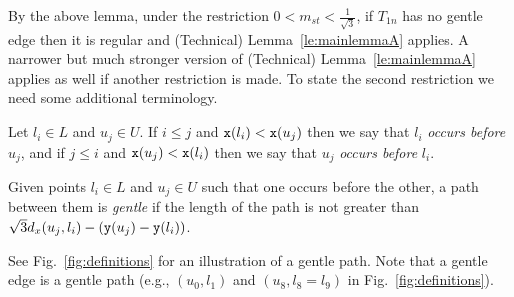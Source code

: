 By the above lemma, under the restriction $0 < m_{st} < \frac{1}{\sqrt{3}}$,
if $T_{1n}$ has no gentle edge then it is regular and (Technical) 
Lemma~\ref{le:mainlemmaA} applies. A narrower but much stronger
version of (Technical) Lemma~\ref{le:mainlemmaA} applies as well if another
restriction is made. To state the second restriction we need
some additional terminology. 

Let $l_i \in L$ and $u_j \in U$. If $i \leq j$ and ${\tt x}(l_i) < {\tt x}(u_j)$
then we say that $l_i$ {\em occurs before} $u_j$, and if $j \leq i$ and
${\tt x}(u_j) < {\tt x}(l_i)$ then we say that $u_j$ {\em occurs before}
$l_i$.
\begin{definition}
Given points $l_i \in L$ and $u_j \in U$ such that one occurs before the other,
a path between them is \emph{gentle} if the length of the path is not greater
than $\sqrt{3}d_x(u_j,l_i)-({\tt y}(u_j)-{\tt y}(l_i))$.
\end{definition}
See Fig.~\ref{fig:definitions} for an illustration of a gentle path. Note that
a gentle edge is a gentle path (e.g., $(u_0,l_1)$ and 
$(u_8,l_8=l_9)$ in Fig.~\ref{fig:definitions}).

